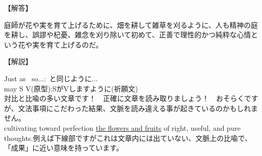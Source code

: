 \documentclass[b4paper,fleqn,dvipdfmx]{jsarticle}
\begin{document}
\begin{flushleft}
【解答】
\end{flushleft}

庭師が花や実を育て上げるために、畑を耕して雑草を刈るように、人も精神の庭を耕し、誤謬や杞憂、雑念を刈り除いて初めて、正善で理性的かつ純粋な心情という花や実を育て上げるのだ。

\begin{flushleft}
【解説】
\end{flushleft}

Just as~ so...:~と同じように...\\
may S V(原型):SがVしますように(祈願文)\\
対比と比喩の多い文章です！　正確に文章を読み取りましょう！　おそらくですが、文法事項にこだわった結果、文脈を読み違える事が起きているのかもしれません。\\
cultivating toward perfection \underline{the flowers and fruits} of right, useful, and pure thoughts.例えば下線部ですがこれは文章内には出ていない、文脈上の比喩で、「成果」に近い意味を持っています。


\newpage
\end{document}
